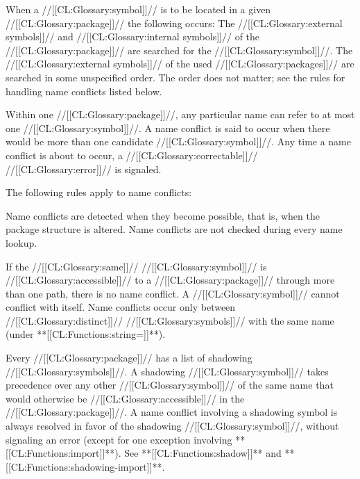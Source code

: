 \endsubsubsubsection%


When a //[[CL:Glossary:symbol]]// is to be located in a given //[[CL:Glossary:package]]//  the following occurs: \beginlist  \itemitem{--} The //[[CL:Glossary:external symbols]]// and //[[CL:Glossary:internal symbols]]// of the  //[[CL:Glossary:package]]// are searched for the //[[CL:Glossary:symbol]]//. \itemitem{--} The //[[CL:Glossary:external symbols]]// of the used //[[CL:Glossary:packages]]// are  searched in some unspecified order.  The order does not matter; see the rules for handling name conflicts listed below.  \endlist

\endsubsubsubsection%


Within one //[[CL:Glossary:package]]//, any particular name can refer to at most one //[[CL:Glossary:symbol]]//.  A name conflict is said to occur when there would be more than one candidate //[[CL:Glossary:symbol]]//.  Any time a name conflict is about to occur, a //[[CL:Glossary:correctable]]// //[[CL:Glossary:error]]// is signaled.  

The following rules apply to name conflicts:

\beginlist

\itemitem{--} Name conflicts are detected when they become possible, that is, when the package structure is altered.  Name conflicts are not checked during every name lookup.

\itemitem{--} If the //[[CL:Glossary:same]]// //[[CL:Glossary:symbol]]// is //[[CL:Glossary:accessible]]// to a //[[CL:Glossary:package]]//  through more than one path, there is no name conflict. A //[[CL:Glossary:symbol]]// cannot conflict with itself.  Name conflicts occur only between //[[CL:Glossary:distinct]]// //[[CL:Glossary:symbols]]// with the same name (under **[[CL:Functions:string=]]**).

\itemitem{--} Every //[[CL:Glossary:package]]// has a list of shadowing //[[CL:Glossary:symbols]]//.   A shadowing //[[CL:Glossary:symbol]]// takes precedence over any other //[[CL:Glossary:symbol]]// of the same name that would otherwise be //[[CL:Glossary:accessible]]// in the //[[CL:Glossary:package]]//.   A name conflict involving a shadowing symbol is always resolved in favor of the shadowing //[[CL:Glossary:symbol]]//, without signaling an error (except for one exception involving **[[CL:Functions:import]]**). See **[[CL:Functions:shadow]]** and **[[CL:Functions:shadowing-import]]**.

